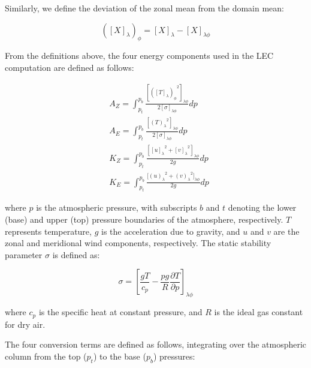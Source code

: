 \documentclass[pdflatex,sn-chicago]{sn-jnl}%
\theoremstyle{plain}
\theoremstyle{definition}
\theoremstyle{remark}
\theoremstyle{definition}
\begin{document}
Similarly, we define the deviation of the zonal mean from the domain mean:

\begin{equation}
    ([X]_\lambda)_\phi = [X]_\lambda - [X]_{\lambda\phi}
\end{equation}

From the definitions above, the four energy components used in the LEC computation are defined as follows:

\begin{align}
   &A_Z = \int_{p_t}^{p_b} \frac{[{([T]_\lambda)_\phi}^{2}]_{\lambda \phi}}  {2[\sigma]_{\lambda \phi}} dp \label{eq:AZ} \\
   &A_E = \int_{p_t}^{p_b} \frac{[{(T)_\lambda}^{2}]_{\lambda \phi}}  {2[\sigma]_{\lambda \phi}} dp \label{eq:AE} \\
   &K_Z =  \int_{p_t}^{p_b} \frac{[{[u]_\lambda}^2 + {[v]_\lambda}^2]_{\lambda \phi}}{2g} dp \label{eq:KZ} \\
   &K_E =  \int_{p_t}^{p_b} \frac{{[(u)_\lambda}^2 + {(v)_\lambda}^2]_{\lambda \phi}}{2g} dp \label{eq:KE}
\end{align}

where $p$ is the atmospheric pressure, with subscripts $b$ and $t$ denoting the lower (base) and upper (top) pressure boundaries of the atmosphere, respectively. $T$ represents temperature, $g$ is the acceleration due to gravity, and $u$ and $v$ are the zonal and meridional wind components, respectively. The static stability parameter $\sigma$ is defined as:


\begin{equation}
    \sigma = \left[\frac{gT}{c_p}-\frac{pg}{R}\frac{\partial T}{\partial p}\right]_{\lambda \phi}
\end{equation}

where $c_p$ is the specific heat at constant pressure, and $R$ is the ideal gas constant for dry air.


The four conversion terms are defined as follows, integrating over the atmospheric column from the top ($p_t$) to the base ($p_b$) pressures:
\end{document}
